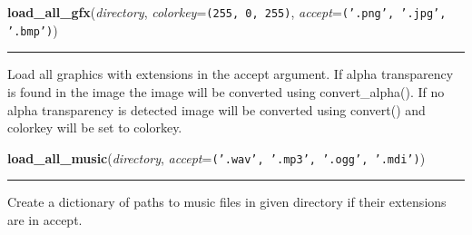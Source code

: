 \hspace{.8\funcindent}\begin{boxedminipage}{\funcwidth}

    \raggedright \textbf{load\_all\_gfx}(\textit{directory}, \textit{colorkey}={\tt \texttt{(}255\texttt{, }0\texttt{, }255\texttt{)}}, \textit{accept}={\tt \texttt{(}\texttt{'}\texttt{.png}\texttt{'}\texttt{, }\texttt{'}\texttt{.jpg}\texttt{'}\texttt{, }\texttt{'}\texttt{.bmp}\texttt{'}\texttt{)}})

    \vspace{-1.5ex}

    \rule{\textwidth}{0.5\fboxrule}
\setlength{\parskip}{2ex}
    Load all graphics with extensions in the accept argument.  If alpha 
    transparency is found in the image the image will be converted using 
    convert\_alpha().  If no alpha transparency is detected image will be 
    converted using convert() and colorkey will be set to colorkey.

\setlength{\parskip}{1ex}
    \end{boxedminipage}

    \label{pygame-asteroids:tools:load_all_music}

    \vspace{0.5ex}

\hspace{.8\funcindent}\begin{boxedminipage}{\funcwidth}

    \raggedright \textbf{load\_all\_music}(\textit{directory}, \textit{accept}={\tt \texttt{(}\texttt{'}\texttt{.wav}\texttt{'}\texttt{, }\texttt{'}\texttt{.mp3}\texttt{'}\texttt{, }\texttt{'}\texttt{.ogg}\texttt{'}\texttt{, }\texttt{'}\texttt{.mdi}\texttt{'}\texttt{)}})

    \vspace{-1.5ex}

    \rule{\textwidth}{0.5\fboxrule}
\setlength{\parskip}{2ex}
    Create a dictionary of paths to music files in given directory if their
    extensions are in accept.

\setlength{\parskip}{1ex}
    \end{boxedminipage}

    \label{pygame-asteroids:tools:load_all_sfx}

